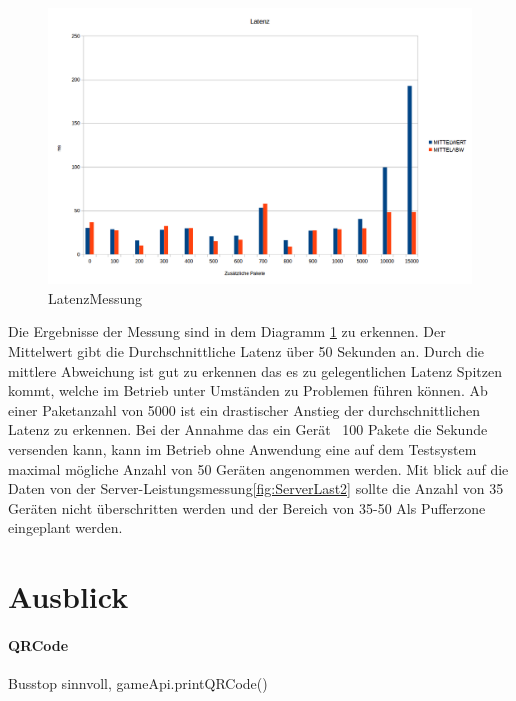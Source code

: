 \documentclass[a4paper]{spie}  %
\begin{document}
\begin{figure}[H]
	\vspace{0pt}
	\hfill
	\vspace{0pt}	
	\centering
	\includegraphics[width=1\textwidth]{./images/LatenzMessung.png}
	\caption{LatenzMessung}
	\label{fig:LatenzMessung}
\end{figure}

Die Ergebnisse der Messung sind in dem Diagramm \ref{fig:LatenzMessung} zu erkennen. Der Mittelwert gibt die Durchschnittliche Latenz über 50 Sekunden an. Durch die mittlere Abweichung ist gut zu erkennen das es zu gelegentlichen Latenz Spitzen kommt, welche im Betrieb unter Umständen zu Problemen führen können. Ab einer Paketanzahl von 5000 ist ein drastischer Anstieg der durchschnittlichen Latenz zu erkennen. Bei der Annahme das ein Gerät ~100 Pakete die Sekunde versenden kann, kann im Betrieb ohne Anwendung eine auf dem Testsystem maximal mögliche Anzahl von 50 Geräten angenommen werden. Mit blick auf die Daten von der Server-Leistungsmessung\ref{fig:ServerLast2} sollte die Anzahl von 35 Geräten nicht überschritten werden und der Bereich von 35-50 Als Pufferzone eingeplant werden.






\section{Ausblick}

\paragraph{QRCode} %
    Busstop sinnvoll, gameApi.printQRCode()
\end{document}
